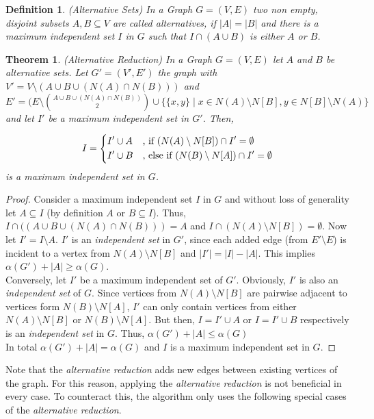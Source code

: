 \documentclass[]{article}
\newtheorem{theorem}{Theorem}
\newtheorem{definition}{Definition}
\begin{document}
\begin{definition} (Alternative Sets)
	In a Graph $G=(V,E)$ two non empty, disjoint subsets $A,B\subseteq V$ are called alternatives, if $|A| = |B|$ and there is a maximum independent set $I$ in $G$ such that $I\cap(A\cup B)$ is either $A$ or $B$.
\end{definition}
\begin{theorem} (Alternative Reduction)
	In a Graph $G=(V,E)$ let $A$ and $B$ be alternative sets. Let $G'=(V', E')$ the graph with $V' = V\setminus(A\cup B\cup (N(A)\cap N(B)))$ and $E' = (E\setminus\binom{A\cup B\cup (N(A)\cap N(B))}{2} \cup \{ \{x,y\}\;|\; x\in N(A)\setminus N[B], y\in N[B]\setminus N(A) \}$ and let $I'$ be a maximum independent set in $G'$. Then,
	
	\[I=\begin{dcases}
	I'\cup A & \text{, if } (N(A)\setminus N[B]) \cap I' = \emptyset%
	\\
	I'\cup B & \text{, else if } (N(B)\setminus N[A])\cap I' = \emptyset
	\end{dcases}\]
	is a maximum independent set in $G$.
\end{theorem}
\begin{proof}
	Consider a maximum independent set $I$ in $G$ and without loss of generality let $A\subseteq I$ (by definition $A$ or $B \subseteq I$). Thus, $I\cap ((A\cup B\cup (N(A)\cap N(B))) = A$ and $I\cap(N(A)\setminus N[B])=\emptyset$. Now let $I' = I\setminus A$. $I'$ is an \textit{independent set} in $G'$, since each added edge (from $E'\setminus E$) is incident to a vertex from $N(A)\setminus N[B]$ and $|I'| = |I|-|A|$. This implies $\alpha(G')+|A| \geq \alpha(G)$.\\
	Conversely, let $I'$ be a maximum independent set of $G'$. Obviously, $I'$ is also an \textit{independent set} of $G$. Since vertices from $N(A)\setminus N[B]$ are pairwise adjacent to vertices form $N(B)\setminus N[A]$, $I'$ can only contain vertices from either $N(A)\setminus N[B]$ or $N(B)\setminus N[A]$. But then, $I=I'\cup A$ or $I=I'\cup B$ respectively is an \textit{independent set} in $G$. Thus, $\alpha(G')+|A| \leq \alpha(G)$\\
	In total $\alpha(G')+|A| = \alpha(G)$ and $I$ is a maximum independent set in $G$.
\end{proof}
Note that the \textit{alternative reduction} adds new edges between existing vertices of the graph. For this reason, applying the \textit{alternative reduction} is not beneficial in every case. To counteract this, the algorithm only uses the following special cases of the \textit{alternative reduction}.
\end{document}
